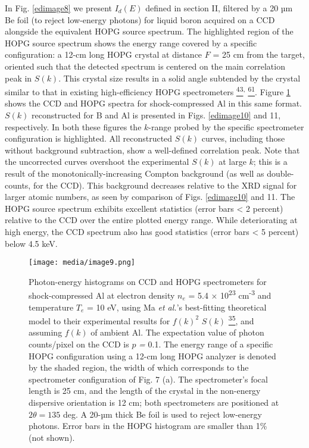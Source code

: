 In Fig. \ref{edimage8} we present \(I_{d}\left( E \right)\) defined in section II,
filtered by a 20 µm Be foil (to reject low-energy photons) for liquid
boron acquired on a CCD alongside the equivalent HOPG source spectrum.
The highlighted region of the HOPG source spectrum shows the energy
range covered by a specific configuration: a 12-cm long HOPG crystal at
distance \(F\) = 25 cm from the target, oriented such that the detected
spectrum is centered on the main correlation peak in \(S(k)\). This
crystal size results in a solid angle subtended by the crystal similar
to that in existing high-efficiency HOPG spectrometers
\hyperref[b.-yaakobi-2012-private-communication.]{\textsuperscript{43}}\textsuperscript{,}
\hyperref[a.-pak-g.-gregori-j.-knight-k.-campbell-d.-price-b.-hammel-o.-l.-landen-and-s.-h.-glenzer-review-of-scientific-instruments-75-3747-2004.]{\textsuperscript{61}}.
Figure \ref{edimage9} shows the CCD and HOPG spectra for shock-compressed Al in this
same format. \(S\left( k \right)\) reconstructed for B and Al is
presented in Figs. \ref{edimage10} and 11, respectively. In both these figures the
\(k\)-range probed by the specific spectrometer configuration is
highlighted. All reconstructed \(S\left( k \right)\) curves, including
those without background subtraction, show a well-defined correlation
peak. Note that the uncorrected curves overshoot the experimental
\(S\left( k \right)\) at large \(k\); this is a result of the
monotonically-increasing Compton background (as well as double-counts,
for the CCD). This background decreases relative to the XRD signal for
larger atomic numbers, as seen by comparison of Figs. \ref{edimage10} and 11. The
HOPG source spectrum exhibits excellent statistics (error bars
\textless{} 2 percent) relative to the CCD over the entire plotted
energy range. While deteriorating at high energy, the CCD spectrum also
has good statistics (error bars \textless{} 5 percent) below 4.5 keV.

\begin{figure}[h] 
\caption{ Photon-energy histograms on
CCD and HOPG spectrometers for shock-compressed Al at electron density
\(n_{e}\) = 5.4 × 10\textsuperscript{23} cm\textsuperscript{-3} and
temperature \(T_{e}\) = 10 eV, using Ma \emph{et al.}'s best-fitting
theoretical model to their experimental results for \({f(k)}^{2}\)
\(S(k)\)
\hyperref[t.-ma-et-al.-physical-review-letters-110-065001-2013.]{\textsuperscript{35}},
and assuming \(f(k)\) of ambient Al. The expectation value of photon
counts/pixel on the CCD is \(p\) \emph{=} 0.1. The energy range of a
specific HOPG configuration using a 12-cm long HOPG analyzer is denoted
by the shaded region, the width of which corresponds to the spectrometer
configuration of Fig. 7 (a). The spectrometer's focal length is 25 cm,
and the length of the crystal in the non-energy dispersive orientation
is 12 cm; both spectrometers are positioned at \(2\theta = 135\) deg. A
20-µm thick Be foil is used to reject low-energy photons. Error bars in
the HOPG histogram are smaller than 1\% (not shown).}
\label{edimage9}
\centering
\texttt{[image: media/image9.png]}
\end{figure}

